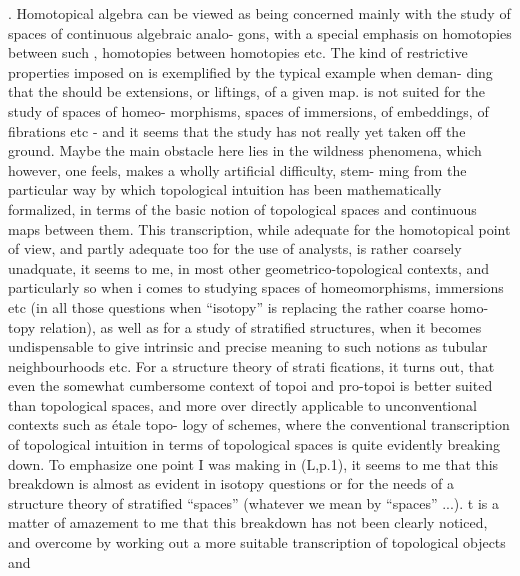 . Homotopical algebra can be viewed as being concerned mainly with
the study of spaces of continuous    algebraic analo-%
gons,   with a special emphasis on homotopies between such ,
homotopies between homotopies etc. The kind of restrictive properties
imposed on   is exemplified by the typical example when deman-%
ding that the    should be extensions, or liftings, of
a given  map.   is not  suited for the study of spaces of homeo-%
morphisms, spaces of immersions, of embeddings, of fibrations etc
- and it seems that the  study  has not really yet taken off the
ground. Maybe the main obstacle here lies in the wildness phenomena,
which however, one feels, makes a wholly artificial difficulty, stem-%
ming from the particular way by which topological intuition has been
mathematically formalized, in terms of the basic notion of topological
spaces and continuous maps between them. This transcription, while
adequate for the homotopical point of view, and partly adequate too
for the use of analysts, is rather coarsely unadquate, it seems to me,
in most other geometrico-topological contexts, and particularly so when
i comes to studying spaces of homeomorphisms, immersions etc (in all
those questions when  ``isotopy'' is replacing the rather coarse homo-%
topy relation), as well as for a study of stratified structures, when
it becomes undispensable to give intrinsic and precise meaning to such
notions as tubular neighbourhoods etc. For a structure theory of strati
fications, it turns out, that even the somewhat cumbersome context of
topoi and pro-topoi is better suited than topological spaces, and more
over directly applicable to unconventional contexts such as étale topo-%
logy of schemes, where the conventional transcription of topological
intuition in terms of topological spaces is quite evidently breaking
down. To emphasize one point I was making in (L,p.1), it seems to me
that this breakdown is almost as evident in  isotopy questions\hand{,} or
for the needs of a structure theory of stratified ``spaces'' (whatever we
mean by ``spaces'' ...).  t is a matter of amazement to me that this
breakdown has not been clearly noticed, and  overcome by 
working out a more suitable transcription of topological objects and
